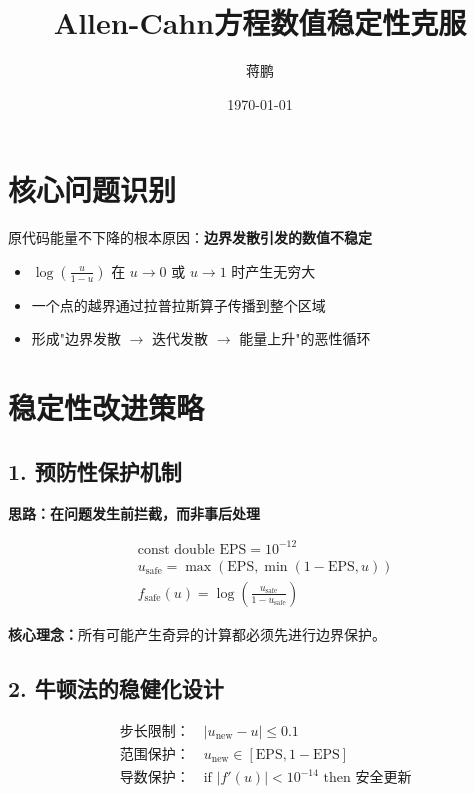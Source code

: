 \documentclass[11pt,a4 paper,one side]{article}
\title{Allen-Cahn方程数值稳定性克服}
\date{\today}
\author{蒋鹏}
\begin{document}
\maketitle
\tableofcontents

\section*{核心问题识别}
原代码能量不下降的根本原因：\textbf{边界发散引发的数值不稳定}

\begin{itemize}
    \item $\log\left(\frac{u}{1-u}\right)$ 在 $u \to 0$ 或 $u \to 1$ 时产生无穷大
    \item 一个点的越界通过拉普拉斯算子传播到整个区域  
    \item 形成"边界发散 $\to$ 迭代发散 $\to$ 能量上升"的恶性循环
\end{itemize}

\section*{稳定性改进策略}

\subsection*{1. 预防性保护机制}

\textbf{思路：在问题发生前拦截，而非事后处理}

\begin{align*}
&\text{const double EPS} = 10^{-12}\\
&u_{\text{safe}} = \max(\text{EPS}, \min(1-\text{EPS}, u))\\
&f_{\text{safe}}(u) = \log\left(\frac{u_{\text{safe}}}{1-u_{\text{safe}}}\right)
\end{align*}

\textbf{核心理念：}所有可能产生奇异的计算都必须先进行边界保护。

\subsection*{2. 牛顿法的稳健化设计}

\begin{align*}
&\text{步长限制：} \quad |u_{\text{new}} - u| \leq 0.1\\
&\text{范围保护：} \quad u_{\text{new}} \in [\text{EPS}, 1-\text{EPS}]\\
&\text{导数保护：} \quad \text{if } |f'(u)| < 10^{-14} \text{ then 安全更新}
\end{align*}
\end{document}
